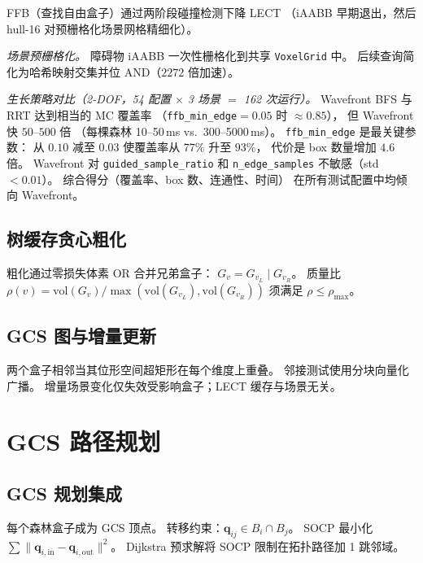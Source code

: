 \documentclass[journal]{IEEEtran}
\begin{document}
FFB（查找自由盒子）通过两阶段碰撞检测下降 LECT
（iAABB 早期退出，然后 hull-16 对预栅格化场景网格精细化）。

\emph{场景预栅格化。}
障碍物 iAABB 一次性栅格化到共享 \texttt{VoxelGrid} 中。
后续查询简化为哈希映射交集并位 AND（$2272$ 倍加速）。

\emph{生长策略对比（2-DOF，54 配置 $\times$ 3 场景 $=$ 162 次运行）。}
Wavefront BFS 与 RRT 达到相当的 MC 覆盖率
（\texttt{ffb\_min\_edge}${}=0.05$ 时 $\approx 0.85$），
但 Wavefront 快 $50$--$500$ 倍
（每棵森林 10--50\,ms vs.\ 300--5000\,ms）。
\texttt{ffb\_min\_edge} 是最关键参数：
从 $0.10$ 减至 $0.03$ 使覆盖率从 $77\%$ 升至 $93\%$，
代价是 box 数量增加 $4.6$ 倍。
Wavefront 对 \texttt{guided\_sample\_ratio}
和 \texttt{n\_edge\_samples} 不敏感（std $< 0.01$）。
综合得分（覆盖率、box 数、连通性、时间）
在所有测试配置中均倾向 Wavefront。

\subsection{树缓存贪心粗化}\label{sec:coarsen}

粗化通过零损失体素 OR 合并兄弟盒子：
$G_{v} = G_{v_L} \mathbin{|} G_{v_R}$。
质量比
$\rho(v) = \mathrm{vol}(G_v) / \max(\mathrm{vol}(G_{v_L}), \mathrm{vol}(G_{v_R}))$
须满足 $\rho \leq \rho_\text{max}$。

\subsection{GCS 图与增量更新}\label{sec:gcs_graph}

两个盒子相邻当其位形空间超矩形在每个维度上重叠。
邻接测试使用分块向量化广播。
增量场景变化仅失效受影响盒子；LECT 缓存与场景无关。

\section{GCS 路径规划}\label{sec:planner}

\subsection{GCS 规划集成}\label{sec:gcs_planning}

每个森林盒子成为 GCS 顶点。
转移约束：$\bm{q}_{ij} \in B_i \cap B_j$。
SOCP 最小化 $\sum \|\bm{q}_{i,\text{in}} - \bm{q}_{i,\text{out}}\|^2$。
Dijkstra 预求解将 SOCP 限制在拓扑路径加 1 跳邻域。
\end{document}
